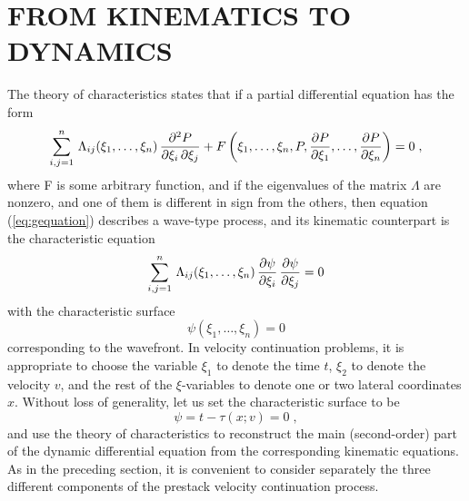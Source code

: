 \section{FROM KINEMATICS TO DYNAMICS}
The theory of characteristics \cite[]{kurant2} states that if a partial
differential equation has the form
\begin{equation}
\sum_{i,j=1}^{n}\,\Lambda_{ij}(\xi_1,\ldots,\xi_n)\,
{{\partial^2 P} \over {\partial \xi_i\,\partial \xi_j}} +
F\left(\xi_1,\ldots,\xi_n,P,
{{\partial P} \over {\partial \xi_1}},\ldots,
{{\partial P} \over {\partial \xi_n}}\right) = 0\;,
\label{eq:gequation}
\end{equation}
where F is some arbitrary function, and if the eigenvalues of the
matrix $\Lambda$ are nonzero, and one of them is different in sign
from the others, then equation (\ref{eq:gequation}) describes a
wave-type process, and its kinematic counterpart is the characteristic
equation
\begin{equation}
\sum_{i,j=1}^{n}\,\Lambda_{ij}(\xi_1,\ldots,\xi_n)\,
{{\partial \psi} \over {\partial \xi_i}}\, 
{{\partial \psi} \over {\partial \xi_j}} = 0
\label{eq:charequation}
\end{equation}
with the characteristic surface 
\begin{equation}
\psi(\xi_1,\ldots,\xi_n) = 0
\label{eq:charsurface}
\end{equation}
corresponding to the wavefront. In velocity continuation problems,
it is appropriate to choose the variable $\xi_1$ to denote the time
$t$, $\xi_2$ to denote the velocity $v$, and the rest of the
$\xi$-variables to denote one or two lateral coordinates $x$. Without
loss of generality, let us set the characteristic surface to be
\begin{equation}
\psi = t - \tau(x;v) = 0\;,
\label{eq:chartau}
\end{equation}
and use the theory of characteristics to reconstruct the main
(second-order) part of the dynamic differential equation from the
corresponding kinematic equations. As in the preceding section, it is
convenient to consider separately the three different components of the prestack
velocity continuation process.

